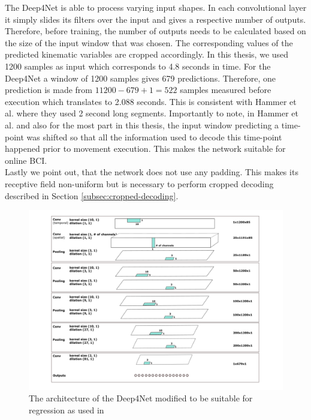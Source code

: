 The Deep4Net is able to process varying input shapes.
In each convolutional layer it simply slides its filters over the input and gives a respective number of outputs.
Therefore, before training, the number of outputs needs to be calculated based on the size of the input window that was chosen.
The corresponding values of the predicted kinematic variables are cropped accordingly.
In this thesis, we used 1200 samples as input which corresponds to 4.8 seconds in time.
For the Deep4Net a window of 1200 samples gives 679 predictions.
Therefore, one prediction is made from $11200 - 679 + 1 = 522 $ samples measured before execution which translates to 2.088 seconds.
This is consistent with Hammer et al. \cite{Hammer-2021} where they used 2 second long segments.
Importantly to note, in Hammer et al. \cite{Hammer-2021} and also for the most part in this thesis, the input window predicting a time-point was shifted so that all the information used to decode this time-point happened prior to movement execution.
This makes the network suitable for online BCI\@. \\

Lastly we point out, that the network does not use any padding. 
This makes its receptive field non-uniform but is necessary to perform cropped decoding described in Section \ref{subsec:cropped-decoding}.

\begin{figure}[!htbp]
\centering
\includegraphics[width=\linewidth]{img/ch3/architektura}
\caption[Deep4Net]{The architecture of the Deep4Net modified to be suitable for regression as used in \cite{Hammer-2021}}
\label{fig:architecture}
\end{figure}

